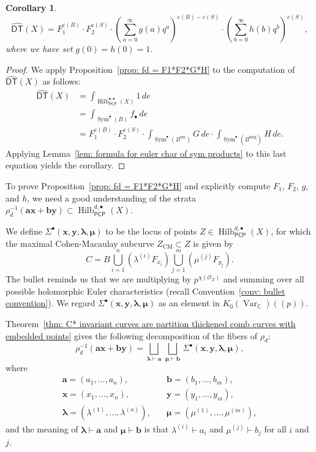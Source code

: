 \documentclass[12pt]{amsart}
\newtheorem{corollary}[theorem]{Corollary}
\theoremstyle{definition}
\newcommand{\CC} {\mathbb{C}}          %
\renewcommand{\O}{\mathcal{O}}
\newcommand{\Sym}{\operatorname{Sym}}
\newcommand{\Hilb}{\operatorname{Hilb}}
\newcommand{\DT}{\mathsf{DT}}
\newcommand{\CM}{\operatorname{CM}}
\newcommand{\Var}{\operatorname{Var}}
\newcommand{\sm}{\operatorname{sm}}
\newcommand{\sing}{\operatorname{sing}}
\newcommand{\boldx}{\boldsymbol{x}}
\newcommand{\boldy}{\boldsymbol{y}}
\newcommand{\bolda}{\boldsymbol{a}}
\newcommand{\boldb}{\boldsymbol{b}}
\newcommand{\boldlambda}{\boldsymbol{\lambda }}
\newcommand{\boldmu}{\boldsymbol{\mu }}
\newcommand{\Sigmaxylambdamu}{\Sigma^{\bullet }(\boldx ,\boldy ,\boldlambda ,\boldmu )}
\newcommand{\DThat}{\widehat{\DT}}
\newcommand{\PCP}{\mathsf{PCP}}
\begin{document}
\begin{corollary}\label{cor: DThat = F1^{e(B)}F2^{e(S)}(sum g q^{a})^{e(B)-e(S)}...}
\[
\DThat (X) = F_{1}^{e(B)}\cdot F_{2}^{e(S)}\cdot
\left(\sum_{a=0}^{\infty}g(a) q^{a} \right)^{e(B)-e(S)}\cdot
\left(\sum_{b=0}^{\infty}h(b) q^{b} \right)^{e(S)},
\]
where we have set $g(0)=h(0)=1$.
\end{corollary}
\begin{proof}
We apply Proposition~\ref{prop: fd = F1*F2*G*H} to the computation of
$\DThat (X)$ as follows:
\begin{align*}
\DThat (X)&= \int_{\Hilb^{\bullet ,\bullet}_{\PCP}(X)} 1\, de\\
&=\int_{\Sym^{\bullet}(B)}f_{\bullet } \, de \\
&= F_{1}^{e(B)}\cdot F_{2}^{e(S)}\cdot  \int_{\Sym^{\bullet}(B^{\sm})}
G\,de \cdot  \int_{\Sym^{\bullet}(B^{\sing})}
H\,de .
\end{align*}
Applying Lemma~\ref{lem: formula for euler char of sym products} to
this last equation yields the corollary. 
\end{proof}


To prove Proposition~\ref{prop: fd = F1*F2*G*H} and explicitly
compute $F_{1}$, $F_{2}$, $g$, and $h$, we need a good understanding
of the strata $\rho_{d}^{-1} (\bolda \boldx +\boldb \boldy )\subset
\Hilb^{d,\bullet}_{\PCP}(X)$.


We define $\Sigmaxylambdamu $ to be the
locus of points $Z \in \Hilb^{d,\bullet}_{\PCP }(X)$, for which the
maximal Cohen-Macaulay subcurve $Z_{\CM} \subset Z$ is given by
\[
C = B \bigcup_{i=1}^{n}\left(\lambda^{(i)}F_{x_{i}} \right)
\bigcup_{j=1}^{m}\left(\mu^{(j)}F_{y_{j}} \right).
\]
The bullet reminds us that we are multiplying by $p^{\chi (\O_{Z})}$
and summing over all possible holomorphic Euler characteristics
(recall Convention~\ref{conv: bullet convention}). We regard
$\Sigmaxylambdamu$ as an element in $ K_{0}(\Var_{\CC})(\!(p)\!)$.

Theorem~\ref{thm: C* invariant curves are
partition thickened comb curves with embedded points} gives the
following decomposition of the fibers of $\rho_{d}$:
\begin{equation} \label{eqn: components of fibers of rho}
\rho_{d}^{-1}(\bolda \boldx +\boldb \boldy ) = \bigsqcup_{\boldlambda
\vdash \bolda}\, \bigsqcup_{\boldmu \vdash \boldb}\,  \Sigmaxylambdamu,
\end{equation}
where 
\begin{align*}
\bolda =(a_{1},\dotsc ,a_{n}),&\quad \boldb =(b_{1},\dotsc
,b_{m}),\\
\boldx =(x_{1},\dotsc ,x_{n}),&\quad \boldy =(y_{1},\dotsc
,y_{m}),\\
\boldlambda =(\lambda^{(1)},\dotsc ,\lambda^{(n)}),&\quad \boldmu =(\mu^{(1)},\dotsc ,\mu^{(m)}),
\end{align*}
and the meaning of $\boldlambda \vdash \bolda$ and $\boldmu \vdash
\boldb$ is that $\lambda^{(i)}\vdash a_{i}$ and $\mu^{(j)}\vdash
b_{j}$ for all $i$ and $j$. 
\end{document}
